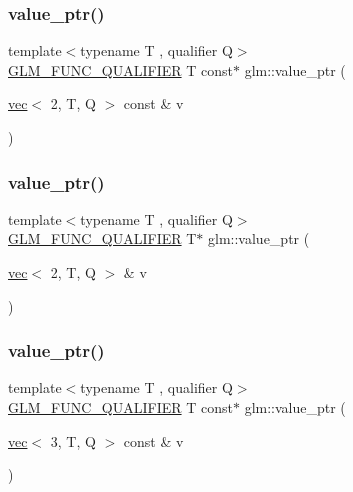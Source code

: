 \subsubsection{\texorpdfstring{value\+\_\+ptr()}{value\_ptr()}\hspace{0.1cm}{\footnotesize\ttfamily [1/27]}}
{\footnotesize\ttfamily template$<$typename T , qualifier Q$>$ \\
\mbox{\hyperlink{setup_8hpp_a33fdea6f91c5f834105f7415e2a64407}{G\+L\+M\+\_\+\+F\+U\+N\+C\+\_\+\+Q\+U\+A\+L\+I\+F\+I\+ER}} T const$\ast$ glm\+::value\+\_\+ptr (\begin{DoxyParamCaption}\item[{\mbox{\hyperlink{structglm_1_1vec}{vec}}$<$ 2, T, Q $>$ const \&}]{v }\end{DoxyParamCaption})}

\mbox{\label{group__gtc__type__ptr_ga54d4e779df698b9d951378dc0de5149d}} 
\subsubsection{\texorpdfstring{value\+\_\+ptr()}{value\_ptr()}\hspace{0.1cm}{\footnotesize\ttfamily [2/27]}}
{\footnotesize\ttfamily template$<$typename T , qualifier Q$>$ \\
\mbox{\hyperlink{setup_8hpp_a33fdea6f91c5f834105f7415e2a64407}{G\+L\+M\+\_\+\+F\+U\+N\+C\+\_\+\+Q\+U\+A\+L\+I\+F\+I\+ER}} T$\ast$ glm\+::value\+\_\+ptr (\begin{DoxyParamCaption}\item[{\mbox{\hyperlink{structglm_1_1vec}{vec}}$<$ 2, T, Q $>$ \&}]{v }\end{DoxyParamCaption})}

\mbox{\label{group__gtc__type__ptr_ga1b0d55a139927496b86be0e2948279a8}} 
\subsubsection{\texorpdfstring{value\+\_\+ptr()}{value\_ptr()}\hspace{0.1cm}{\footnotesize\ttfamily [3/27]}}
{\footnotesize\ttfamily template$<$typename T , qualifier Q$>$ \\
\mbox{\hyperlink{setup_8hpp_a33fdea6f91c5f834105f7415e2a64407}{G\+L\+M\+\_\+\+F\+U\+N\+C\+\_\+\+Q\+U\+A\+L\+I\+F\+I\+ER}} T const$\ast$ glm\+::value\+\_\+ptr (\begin{DoxyParamCaption}\item[{\mbox{\hyperlink{structglm_1_1vec}{vec}}$<$ 3, T, Q $>$ const \&}]{v }\end{DoxyParamCaption})}


